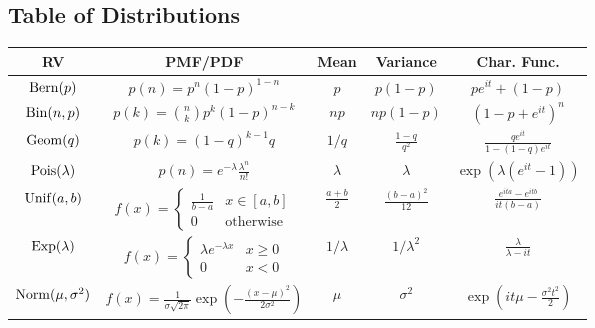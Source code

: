 \begin{appendices}
	
	\section{Table of Distributions}
	
	\begin{center}
		\begin{tabular}{|c|c|c|c|c|}
			\hline
			RV & PMF/PDF & Mean & Variance & Char. Func. \\
			\hline
			$\operatorname{Bern}(p)$ & $\displaystyle p(n)=p^n(1-p)^{1-n}$ & $\displaystyle p$ & $\displaystyle p(1-p)$ & $\displaystyle pe^{it}+(1-p)$\\
			\hline
			$\operatorname{Bin}(n,p)$ & $\displaystyle p(k) = \binom{n}{k}p^k (1-p)^{n-k}$ & $\displaystyle np$ & $\displaystyle np(1-p)$ & $\displaystyle (1-p+e^{it})^n$\\
			\hline
			$\operatorname{Geom}(q)$ & $\displaystyle p(k) = (1-q)^{k-1}q$ & $\displaystyle 1/q$ & $\displaystyle \frac{1-q}{q^2}$ & $\displaystyle \frac{qe^{it}}{1-(1-q)e^{it}}$\\
			\hline
			$\operatorname{Pois}(\lambda)$ & $\displaystyle p(n) = e^{-\lambda}\frac{\lambda^n}{n!}$ & $\displaystyle \lambda$ & $\displaystyle \lambda$ & $\displaystyle \exp\left(\lambda(e^{it} - 1)\right)$\\
			\hline
			$\operatorname{Unif}(a,b)$ &
			$\displaystyle f(x) = \begin{cases}
				\frac{1}{b-a} & x \in [a,b]\\
				0 & \text{otherwise}
			\end{cases}$ & $\displaystyle \frac{a+b}{2}$ & $\displaystyle \frac{(b-a)^2}{12}$ & $\displaystyle \frac{e^{ita}-e^{itb}}{it(b-a)}$\\
			\hline
			$\operatorname{Exp}(\lambda)$ &
			$\displaystyle f(x) = \begin{cases}
				\lambda e^{-\lambda x} & x \geq 0\\
				0 & x < 0
			\end{cases}$ & $\displaystyle 1/\lambda$ & $\displaystyle 1/\lambda^2$ & $\displaystyle \frac{\lambda}{\lambda - it}$\\
			\hline
			$\operatorname{Norm}(\mu, \sigma^2)$ & $\displaystyle f(x) = \frac{1}{\sigma\sqrt{2\pi}}\exp\left(-\frac{(x-\mu)^2}{2\sigma^2}\right)$  & $\displaystyle \mu$ & $\displaystyle \sigma^2$ & $\displaystyle \exp\left(it\mu-\frac{\sigma^2 t^2}{2}\right)$\\
			\hline
		\end{tabular}
	\end{center}
	
\end{appendices}

